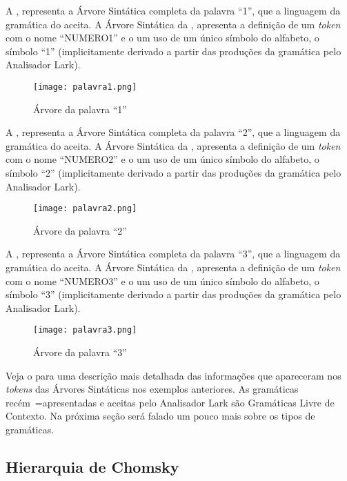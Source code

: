 A ,
representa a Árvore Sintática completa da palavra ``1'',
que a linguagem da gramática do  aceita.
A Árvore Sintática da ,
apresenta a definição de um \textit{token} com o nome ``NUMERO1'' e
o um uso de um único símbolo do alfabeto,
o símbolo ``1'' (implicitamente derivado a partir das produções da gramática pelo Analisador Lark).
\begin{figure}[H]
\caption{Árvore da palavra ``1''}
\label{figure:palavra1}
\centering
\texttt{[image: palavra1.png]}
\end{figure}

A ,
representa a Árvore Sintática completa da palavra ``2'',
que a linguagem da gramática do  aceita.
A Árvore Sintática da ,
apresenta a definição de um \textit{token} com o nome ``NUMERO2'' e
o um uso de um único símbolo do alfabeto,
o símbolo ``2'' (implicitamente derivado a partir das produções da gramática pelo Analisador Lark).
\begin{figure}[H]
\caption{Árvore da palavra ``2''}
\label{figure:palavra2}
\centering
\texttt{[image: palavra2.png]}
\end{figure}

A ,
representa a Árvore Sintática completa da palavra ``3'',
que a linguagem da gramática do  aceita.
A Árvore Sintática da ,
apresenta a definição de um \textit{token} com o nome ``NUMERO3'' e
o um uso de um único símbolo do alfabeto,
o símbolo ``3'' (implicitamente derivado a partir das produções da gramática pelo Analisador Lark).
\begin{figure}[H]
\caption{Árvore da palavra ``3''}
\label{figure:palavra3}
\centering
\texttt{[image: palavra3.png]}
\end{figure}

Veja o  para uma descrição mais detalhada das informações que apareceram nos \textit{tokens} das Árvores Sintáticas nos exemplos anteriores.
As gramáticas recém~=apresentadas e
aceitas pelo Analisador Lark são Gramáticas Livre de Contexto.
Na próxima seção será falado um pouco mais sobre os tipos de gramáticas.


\subsection{Hierarquia de Chomsky}
\label{section:sectionHierarquiaDeChomsky}

